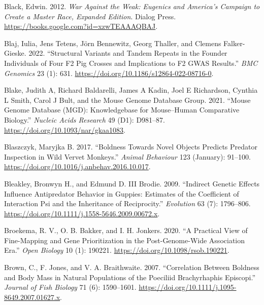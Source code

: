 \documentclass[
]{book}
\newlength{\cslhangindent}
\newlength{\cslentryspacingunit} %
\newenvironment{CSLReferences}[2] %
 {%
  \setlength{\parindent}{0pt}
  \ifodd #1
  \let\oldpar\par
  \def\par{\hangindent=\cslhangindent\oldpar}
  \fi
  \setlength{\parskip}{#2\cslentryspacingunit}
 }%
 {}
\begin{document}
\begin{CSLReferences}{1}{0}
\leavevmode{}%
Black, Edwin. 2012. \emph{War {Against} the {Weak}: {Eugenics} and {America}'s {Campaign} to {Create} a {Master Race}, {Expanded Edition}}. {Dialog Press}. \url{https://books.google.com?id=xzwTEAAAQBAJ}.

\leavevmode{}%
Blaj, Iulia, Jens Tetens, Jörn Bennewitz, Georg Thaller, and Clemens Falker-Gieske. 2022. {``Structural Variants and Tandem Repeats in the Founder Individuals of Four {F2} Pig Crosses and Implications to {F2 GWAS} Results.''} \emph{BMC Genomics} 23 (1): 631. \url{https://doi.org/10.1186/s12864-022-08716-0}.

\leavevmode{}%
Blake, Judith A, Richard Baldarelli, James A Kadin, Joel E Richardson, Cynthia L Smith, Carol J Bult, and the Mouse Genome Database Group. 2021. {``Mouse {Genome Database} ({MGD}): {Knowledgebase} for Mouse--Human Comparative Biology.''} \emph{Nucleic Acids Research} 49 (D1): D981--87. \url{https://doi.org/10.1093/nar/gkaa1083}.

\leavevmode{}%
Blaszczyk, Maryjka B. 2017. {``Boldness Towards Novel Objects Predicts Predator Inspection in Wild Vervet Monkeys.''} \emph{Animal Behaviour} 123 (January): 91--100. \url{https://doi.org/10.1016/j.anbehav.2016.10.017}.

\leavevmode{}%
Bleakley, Bronwyn H., and Edmund D. III Brodie. 2009. {``Indirect Genetic Effects Influence Antipredator Behavior in Guppies: {Estimates} of the Coefficient of Interaction Psi and the Inheritance of Reciprocity.''} \emph{Evolution} 63 (7): 1796--806. \url{https://doi.org/10.1111/j.1558-5646.2009.00672.x}.

\leavevmode{}%
Broekema, R. V., O. B. Bakker, and I. H. Jonkers. 2020. {``A Practical View of Fine-Mapping and Gene Prioritization in the Post-Genome-Wide Association Era.''} \emph{Open Biology} 10 (1): 190221. \url{https://doi.org/10.1098/rsob.190221}.

\leavevmode{}%
Brown, C., F. Jones, and V. A. Braithwaite. 2007. {``Correlation Between Boldness and Body Mass in Natural Populations of the Poeciliid {Brachyrhaphis} Episcopi.''} \emph{Journal of Fish Biology} 71 (6): 1590--1601. \url{https://doi.org/10.1111/j.1095-8649.2007.01627.x}.


\end{CSLReferences}
\end{document}
